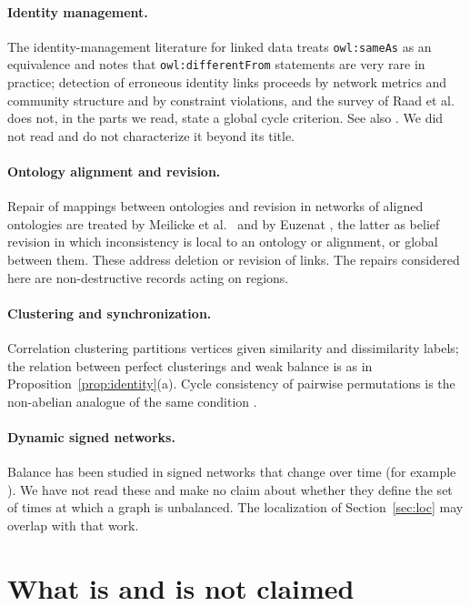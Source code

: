 \documentclass[11pt]{article}
\theoremstyle{plain}
\theoremstyle{definition}
\theoremstyle{remark}
\begin{document}
\paragraph{Identity management.} The identity-management literature for linked data treats \texttt{owl:sameAs} as an equivalence and notes that \texttt{owl:differentFrom} statements are very rare in practice; detection of erroneous identity links proceeds by network metrics and community structure and by constraint violations, and the survey of Raad et al.\ \cite{raad-survey} does not, in the parts we read, state a global cycle criterion. See also \cite{halpin2010,raad2018,papaleo2014}. We did not read \cite{papaleo2014} and do not characterize it beyond its title.

\paragraph{Ontology alignment and revision.} Repair of mappings between ontologies and revision in networks of aligned ontologies are treated by Meilicke et al.\ \cite{meilicke2007} and by Euzenat \cite{euzenat2015}, the latter as belief revision in which inconsistency is local to an ontology or alignment, or global between them. These address deletion or revision of links. The repairs considered here are non-destructive records acting on regions.

\paragraph{Clustering and synchronization.} Correlation clustering \cite{bbc2004} partitions vertices given similarity and dissimilarity labels; the relation between perfect clusterings and weak balance is as in Proposition~\ref{prop:identity}(a). Cycle consistency of pairwise permutations is the non-abelian analogue of the same condition \cite{pachauri2013}.

\paragraph{Dynamic signed networks.} Balance has been studied in signed networks that change over time (for example \cite{dynamic1,dynamic2}). We have not read these and make no claim about whether they define the set of times at which a graph is unbalanced. The localization of Section~\ref{sec:loc} may overlap with that work.

\section{What is and is not claimed}\label{sec:claims}
\end{document}
